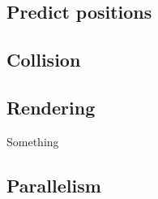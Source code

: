 

\subsection{Predict positions}


\subsection{Collision}


\subsection{Rendering}

Something \cite{van2009screen}

\subsection{Parallelism}

